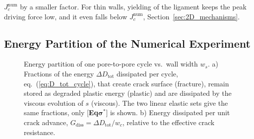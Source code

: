 \documentclass[pdflatex,sn-mathphys-num]{sn-jnl}%
\newcommand{\EqSigmaStarLabel}{[\textbf{Eq$\boldsymbol{\sigma^*}$}]\xspace}
\theoremstyle{thmstyleone}%
\theoremstyle{thmstyletwo}%
\theoremstyle{thmstylethree}%
\begin{document}
$J_c^{\text{num}}$ by a smaller factor. For thin walls, yielding of the ligament keeps the peak driving force low, and it even falls below $J_c^{\text{num}}$, Section~\ref{sec:2D_mechanisms}.

\subsection{Energy Partition of the Numerical Experiment}
\label{sec:2D_energy_partition}

\begin{figure}[htb]
    \centering
    \resizebox{0.9\textwidth}{!}{}%
    \caption{Energy partition of one pore-to-pore cycle vs.\ wall width $w_s$. a) Fractions of the energy $\Delta D_{\text{tot}}$ dissipated per cycle, eq.~(\ref{eq:D_tot_cycle}), that create crack surface (fracture), remain stored as degraded plastic energy (plastic) and are dissipated by the viscous evolution of $s$ (viscous). The two linear elastic sets give the same fractions, only \EqSigmaStarLabel is shown. b) Energy dissipated per unit crack advance, $G_{\text{diss}} = \Delta D_{\text{tot}}/w_c$, relative to the effective crack resistance.}
    \label{fig:energy_partition_cycle}
\end{figure}
\end{document}

